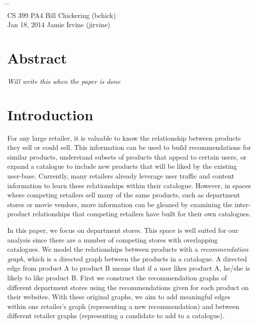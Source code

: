 \documentclass[10pt]{article}
\begin{document}

{\LARGE\bf
\begin{tabbing}
\hspace{2.8in} \= \hspace{1.3in} \= \hspace{1.2in} \= \\

CS 399 \> PA4 \> Bill Chickering (bchick)\\
\normalsize Jan 18, 2014 \> \> Jamie Irvine (jirvine)
\end{tabbing}
} \vspace{.4in}

\section*{Abstract}
\emph{Will write this when the paper is done}

\section*{Introduction}
For any large retailer, it is valuable to know the relationship between
products they sell or could sell. This information can be used to build
recommendations for similar products, understand subsets of products that
appeal to certain users, or expand a catalogue to include new products that
will be liked by the existing user-base. Currently, many retailers already
leverage user traffic and content information to learn these relationships
within their catalogue. However, in spaces where competing retailers sell many
of the same products, such as department stores or movie vendors, more
information can be gleaned by examining the inter-product relationships that
competing retailers have built for their own catalogues.

In this paper, we focus on department stores. This space is well suited for our
analysis since there are a number of competing stores with overlapping
catalogues. We model the relationships between products with a
\emph{recommendation graph}, which is a directed graph between the products in
a catalogue. A directed edge from product A to product B means that if a user
likes product A, he/she is likely to like product B. First we construct the
recommendation graphs of different department stores using the recommendations
given for each product on their websites. With these original graphs, we aim to
add meaningful edges within one retailer's graph (representing a new
recommendation) and between different retailer graphs (representing a candidate
to add to a catalogue). 
\end{document}
